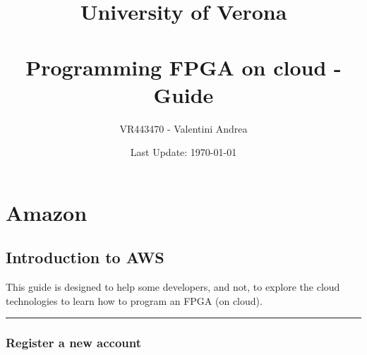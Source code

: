 \documentclass[a4paper]{article}
\newcommand{\longline}{\noindent\rule{\textwidth}{0.4pt}}
\begin{document}
    \author{VR443470 - Valentini Andrea}
    \title{University of Verona \\
    \:\\
    Programming FPGA on cloud - Guide}
    \date{Last Update: \today}

    \maketitle

    \newpage

    \tableofcontents

    \newpage

    \section{Amazon}

    \subsection{Introduction to AWS}

    This guide is designed to help some developers, and not, to explore the cloud technologies to learn how to program an FPGA (on cloud).

    \longline
    
    \subsubsection{Register a new account}
\end{document}
